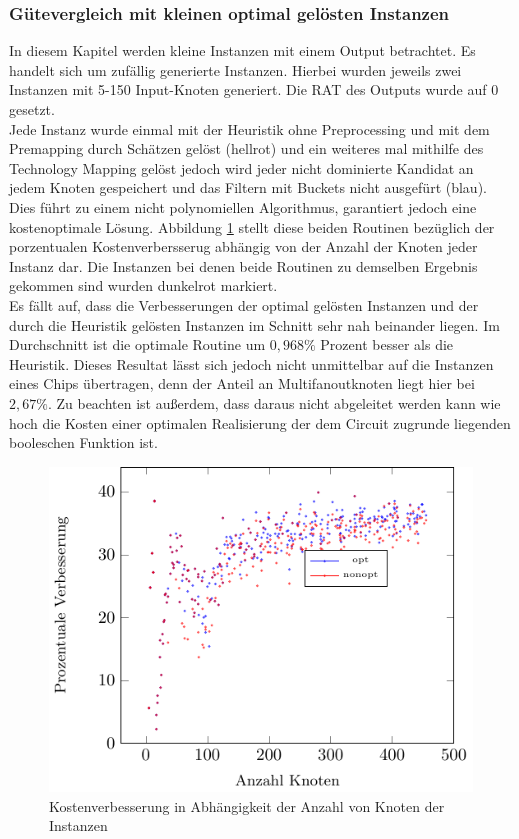 \documentclass[11pt, a4paper, german]{article}
\newcommand{\TM}{Technology  Mapping }
\begin{document}
\subsubsection{Gütevergleich mit kleinen optimal gel\"osten Instanzen}
\label{subsubsec:guetevgl_kleiner_opt_instanzen}
In diesem Kapitel werden kleine Instanzen mit einem Output betrachtet. Es handelt sich um zuf\"allig generierte Instanzen. Hierbei wurden jeweils zwei Instanzen mit 5-150 Input-Knoten generiert. Die RAT des Outputs wurde auf $0$ gesetzt.\\
Jede Instanz wurde einmal mit der Heuristik ohne Preprocessing und mit dem Premapping durch Sch\"atzen gel\"ost (hellrot) und ein weiteres mal mithilfe des \TM gel\"ost jedoch wird jeder nicht dominierte Kandidat an jedem Knoten gespeichert und das Filtern mit Buckets nicht ausgef\"urt (blau). Dies f\"uhrt zu einem nicht polynomiellen Algorithmus, garantiert jedoch eine kostenoptimale L\"osung. Abbildung \ref{bild:small_opt_test} stellt diese beiden Routinen bez\"uglich der porzentualen Kostenverbersserug abh\"angig von der Anzahl der Knoten jeder Instanz dar.
Die Instanzen bei denen beide Routinen zu demselben Ergebnis gekommen sind wurden dunkelrot markiert.\\
Es f\"allt auf, dass die Verbesserungen der optimal gel\"osten Instanzen und der durch die Heuristik gel\"osten Instanzen im Schnitt sehr nah beinander liegen. Im Durchschnitt ist die optimale Routine um $0,968\%$ Prozent besser als die Heuristik. Dieses Resultat l\"asst sich jedoch nicht unmittelbar auf die Instanzen eines Chips \"ubertragen, denn der Anteil an Multifanoutknoten liegt hier bei $2,67\%$. Zu beachten ist au{\ss}erdem, dass daraus nicht abgeleitet werden kann wie hoch die Kosten einer optimalen  Realisierung der dem Circuit zugrunde liegenden booleschen Funktion ist.\\
\begin{figure}[h]
		\centering
		\includegraphics[width = 12.5cm]{pictures/tex_files/analysis/small_opt_test}
		\caption{Kostenverbesserung in Abh\"angigkeit der Anzahl von Knoten der Instanzen}
		\label{bild:small_opt_test}
\end{figure}
\end{document}
